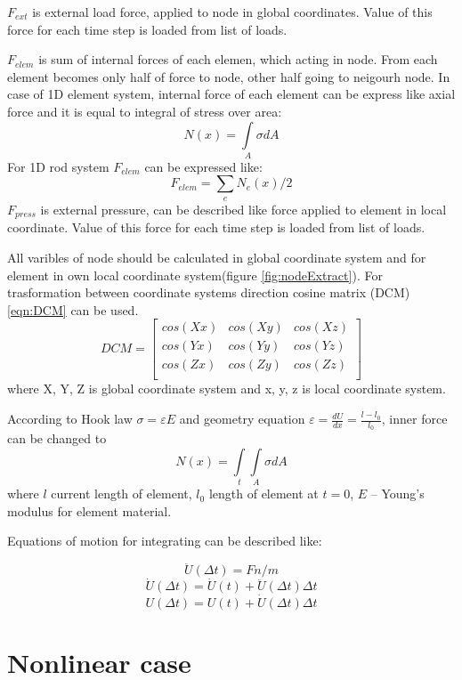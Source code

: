 \documentclass[12pt]{report}
\begin{document}
$F_{ext}$ is external load force, applied to node in global coordinates. Value of this force for each time step is loaded
from list of loads.\par
$F_{elem}$ is sum of internal forces of each elemen, which acting in node. From each element becomes only half of force to 
node, other half going to neigourh node. In case of 1D element system, internal force of each element can be express like
axial force and it is equal to integral of stress over area:
\begin{equation}\label{eqn:Nx}
  N(x)= \int\limits_A \sigma dA
\end{equation}
For 1D rod system $F_{elem}$ can be expressed like:
\begin{equation}\label{eqn:Felem}
  F_{elem}= \sum_{e}N_e(x)/2
\end{equation}
$F_{press}$ is external pressure, can be described like force applied to element in local coordinate. Value of this force
for each time step is loaded from list of loads. \par
All varibles of node should be calculated in global coordinate system and for element in own local coordinate 
system(figure \ref{fig:nodeExtract}). For trasformation between coordinate systems direction cosine matrix
(DCM)\eqref{eqn:DCM} can be used.
\begin{equation}\label{eqn:DCM}
  DCM= \begin{bmatrix}
    cos(Xx)&cos(Xy)&cos(Xz)\\
    cos(Yx)&cos(Yy)&cos(Yz)\\
    cos(Zx)&cos(Zy)&cos(Zz)\\
   \end{bmatrix} 
\end{equation}
 where {X, Y, Z} is global coordinate system and {x, y, z} is local coordinate system.\par
 According to Hook law $\sigma=\varepsilon E$ and geometry equation $\varepsilon=\frac{dU}{dx}=\frac{l-l_0}{l_0}$,
 inner force can be changed to
 \begin{equation}\label{eqn:NxFull}
  N(x)= \int\limits_t\int\limits_A \sigma dA
\end{equation}
 where $l$ current length of element, $l_0$ length of element at $t=0$, $E$ – Young’s modulus for element material.\par
 Equations of motion for integrating can be described like:

\begin{equation}\label{eqn:Accel}
  \ddot{U}(\Delta t)=Fn/m
\end{equation}
\begin{equation}\label{eqn:Velos}
  \dot{U}(\Delta t)=\dot{U}(t)+\ddot{U}(\Delta t)\Delta t
\end{equation}
\begin{equation}\label{eqn:Displ}
  U(\Delta t)=U(t)+\dot{U}(\Delta t)\Delta t
\end{equation}
 
 \pagebreak

\section {Nonlinear case}
\end{document}

